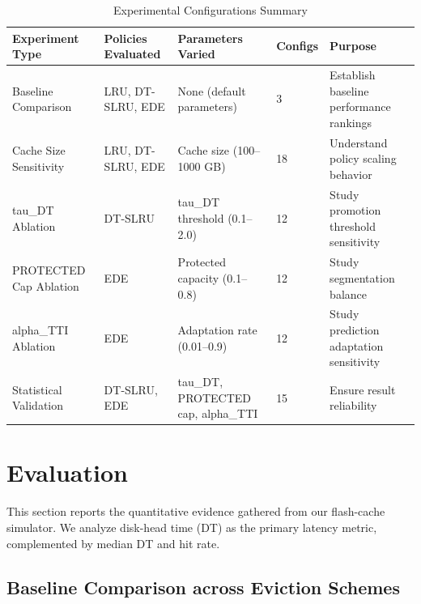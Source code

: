 \documentclass[sigconf]{acmart}
\begin{document}
\begin{table}[t]
\caption{Experimental Configurations Summary}
\label{tab:exp-configs}
\centering

\renewcommand{\arraystretch}{1.05}

\begin{tabular}{%
p{}%
p{}%
p{}%
p{}%
p{}%
}
\toprule
\textbf{Experiment Type} &
\textbf{Policies Evaluated} &
\textbf{Parameters Varied} &
\textbf{Configs} &
\textbf{Purpose} \\
\midrule

Baseline Comparison &
LRU, DT-SLRU, EDE &
None (default parameters) &
3 &
Establish baseline performance rankings \\

Cache Size Sensitivity &
LRU, DT-SLRU, EDE &
Cache size (100--1000 GB) &
18 &
Understand policy scaling behavior \\

tau\_DT Ablation &
DT-SLRU &
tau\_DT threshold (0.1--2.0) &
12 &
Study promotion threshold sensitivity \\

PROTECTED Cap Ablation &
EDE &
Protected capacity (0.1--0.8) &
12 &
Study segmentation balance \\

alpha\_TTI Ablation &
EDE &
Adaptation rate (0.01--0.9) &
12 &
Study prediction adaptation sensitivity \\

Statistical Validation &
DT-SLRU, EDE &
tau\_DT, PROTECTED cap, alpha\_TTI &
15 &
Ensure result reliability \\
\bottomrule
\end{tabular}
\end{table}


\clearpage
\section{Evaluation}
\label{sec:evaluation}
\FloatBarrier

This section reports the quantitative evidence gathered from our flash-cache simulator. We analyze disk-head time (DT) as the primary latency metric, complemented by median DT and hit rate. 

\subsection{Baseline Comparison across Eviction Schemes}
\end{document}
